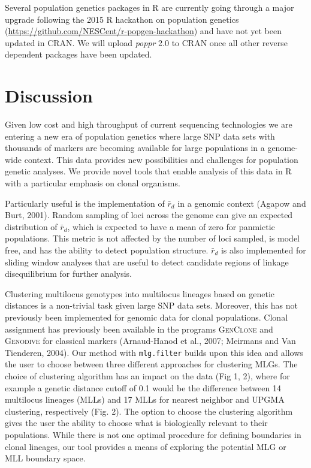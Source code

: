 \documentclass{frontiersSCNS} %
\begin{document}
Several population genetics packages in R are currently going through a
major upgrade following the 2015 R hackathon on population genetics
(\url{https://github.com/NESCent/r-popgen-hackathon}) and have not yet
been updated in CRAN. We will upload \emph{poppr} 2.0 to CRAN once all
other reverse dependent packages have been updated.

\section*{Discussion}\label{discussion}

Given low cost and high throughput of current sequencing technologies we
are entering a new era of population genetics where large SNP data sets
with thousands of markers are becoming available for large populations
in a genome- wide context. This data provides new possibilities and
challenges for population genetic analyses. We provide novel tools that
enable analysis of this data in R with a particular emphasis on clonal
organisms.

Particularly useful is the implementation of \(\bar{r}_d\) in a genomic
context (Agapow and Burt, 2001). Random sampling of loci across the
genome can give an expected distribution of \(\bar{r}_d\), which is
expected to have a mean of zero for panmictic populations. This metric
is not affected by the number of loci sampled, is model free, and has
the ability to detect population structure. \(\bar{r}_d\) is also
implemented for sliding window analyses that are useful to detect
candidate regions of linkage disequilibrium for further analysis.

Clustering multilocus genotypes into multilocus lineages based on
genetic distances is a non-trivial task given large SNP data sets.
Moreover, this has not previously been implemented for genomic data for
clonal populations. Clonal assignment has previously been available in
the programs \textsc{GenClone} and \textsc{Genodive} for classical
markers (Arnaud-Hanod et al., 2007; Meirmans and Van Tienderen, 2004).
Our method with \texttt{mlg.filter} builds upon this idea and allows the
user to choose between three different approaches for clustering MLGs.
The choice of clustering algorithm has an impact on the data (Fig 1, 2),
where for example a genetic distance cutoff of 0.1 would be the
difference between 14 multilocus lineages (MLLs) and 17 MLLs for nearest
neighbor and UPGMA clustering, respectively (Fig. 2). The option to
choose the clustering algorithm gives the user the ability to choose
what is biologically relevant to their populations. While there is not
one optimal procedure for defining boundaries in clonal lineages, our
tool provides a means of exploring the potential MLG or MLL boundary
space.
\end{document}
